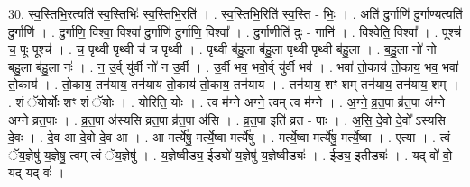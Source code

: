 \documentclass[17pt]{extarticle}
\begin{document}
30. स्व॒स्तिभि॒रत्यति॑ स्व॒स्तिभिः॑ स्व॒स्तिभि॒रति॑ । . स्व॒स्तिभि॒रिति॑ स्व॒स्ति - भिः॒ । . अति॑ दु॒र्गाणि॑ दु॒र्गाण्यत्यति॑ दु॒र्गाणि॑ । . दु॒र्गाणि॒ विश्वा॒ विश्वा॑ दु॒र्गाणि॑ दु॒र्गाणि॒ विश्वा᳚ । . दु॒र्गाणीति॑ दुः - गानि॑ । . विश्वेति॒ विश्वा᳚ । . पूश्च॑ च॒ पूः पूश्च॑ । . च॒ पृ॒थ्वी पृ॒थ्वी च॑ च पृ॒थ्वी । . पृ॒थ्वी ब॑हु॒ला ब॑हु॒ला पृ॒थ्वी पृ॒थ्वी ब॑हु॒ला । . ब॒हु॒ला नो॑ नो बहु॒ला ब॑हु॒ला नः॑ । . न॒ उ॒र्व् यु॑र्वी नो॑ न उ॒र्वी । . उ॒र्वी भव॒ भवो॒र्व् यु॑र्वी भव॑ । . भवा॑ तो॒काय॑ तो॒काय॒ भव॒ भवा॑ तो॒काय॑ । . तो॒काय॒ तन॑याय॒ तन॑याय तो॒काय॑ तो॒काय॒ तन॑याय । . तन॑याय॒ शꣳ शम् तन॑याय॒ तन॑याय॒ शम् । . शं ॅयोर्योः शꣳ शं ॅयोः । . योरिति॒ योः । . त्व म॑ग्ने अग्ने॒ त्वम् त्व म॑ग्ने । . अ॒ग्ने॒ व्र॒त॒पा व्र॑त॒पा अ॑ग्ने अग्ने व्रत॒पाः । . व्र॒त॒पा अ॑स्यसि व्रत॒पा व्र॑त॒पा अ॑सि । . व्र॒त॒पा इति॑ व्रत - पाः । . अ॒सि॒ दे॒वो दे॒वो᳚ ऽस्यसि दे॒वः । . दे॒व आ दे॒वो दे॒व आ । . आ मर्त्ये॑षु॒ मर्त्ये॒ष्वा मर्त्ये॑षु । . मर्त्ये॒ष्वा मर्त्ये॑षु॒ मर्त्ये॒ष्वा । . एत्या । . त्वं ॅय॒ज्ञेषु॑ य॒ज्ञेषु॒ त्वम् त्वं ॅय॒ज्ञेषु॑ । . य॒ज्ञेष्वीड्य॒ ईड्यो॑ य॒ज्ञेषु॑ य॒ज्ञेष्वीड्यः॑ । . ईड्य॒ इतीड्यः॑ । . यद् वो॑ वो॒ यद् यद् वः॑ । \newline
\end{document}
